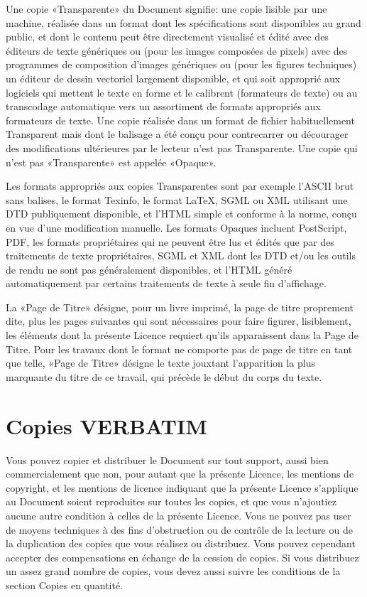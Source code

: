 Une copie «Transparente» du Document signifie: une copie
lisible par une machine, réalisée dans un format dont les spécifications
sont disponibles au grand public, et dont le contenu peut être directement
visualisé et édité avec des éditeurs de texte génériques ou (pour
les images composées de pixels) avec des programmes de composition
d'images génériques ou (pour les figures techniques) un éditeur de
dessin vectoriel largement disponible, et qui soit approprié aux logiciels
qui mettent le texte en forme et le calibrent (formateurs de texte)
ou au transcodage automatique vers un assortiment de formats appropriés
aux formateurs de texte. Une copie réalisée dans un format de fichier
habituellement Transparent mais dont le balisage a été conçu pour
contrecarrer ou décourager des modifications ultérieures par le lecteur
n'est pas Transparente. Une copie qui n'est pas «Transparente» est
appelée «Opaque». 

Les formats appropriés aux copies Transparentes sont par
exemple l'ASCII brut sans balises, le format Texinfo, le format \LaTeX{},
SGML ou XML utilisant une DTD publiquement disponible, et l'HTML simple
et conforme à la norme, conçu en vue d'une modification manuelle.
Les formats Opaques incluent PostScript, PDF, les formats propriétaires
qui ne peuvent être lus et édités que par des traitements de texte
propriétaires, SGML et XML dont les DTD et/ou les outils de rendu
ne sont pas généralement disponibles, et l'HTML généré automatiquement
par certains traitements de texte à seule fin d'affichage. 

La «Page de Titre» désigne, pour un livre imprimé, la page
de titre proprement dite, plus les pages suivantes qui sont nécessaires
pour faire figurer, lisiblement, les éléments dont la présente Licence
requiert qu'ils apparaissent dans la Page de Titre. Pour les travaux
dont le format ne comporte pas de page de titre en tant que telle,
«Page de Titre» désigne le texte jouxtant l'apparition la plus marquante
du titre de ce travail, qui précède le début du corps du texte. 


\section{Copies VERBATIM} 

Vous pouvez copier et distribuer le Document sur tout support,
aussi bien commercialement que non, pour autant que la présente Licence,
les mentions de copyright, et les mentions de licence indiquant que
la présente Licence s'applique au Document soient reproduites sur
toutes les copies, et que vous n'ajoutiez aucune autre condition à
celles de la présente Licence. Vous ne pouvez pas user de moyens techniques
à des fins d'obstruction ou de contrôle de la lecture ou de la duplication
des copies que vous réalisez ou distribuez. Vous pouvez cependant
accepter des compensations en échange de la cession de copies. Si
vous distribuez un assez grand nombre de copies, vous devez aussi
suivre les conditions de la section Copies en quantité. 

